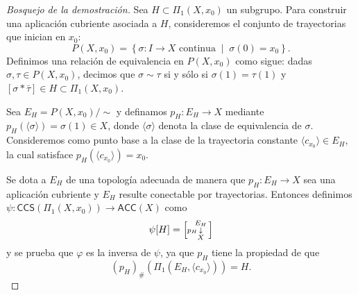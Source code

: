 \begin{proof}[Bosquejo de la demostración]
Sea $H \subset \Pi_1(X, x_0)$ un subgrupo. Para construir una aplicación cubriente asociada a $H$, consideremos el conjunto de trayectorias que inician en $x_0$:
\[
P(X, x_0) = \left\{ \sigma \colon I \to X \text{ continua} \;\middle|\; \sigma(0) = x_0 \right\}.
\]
Definimos una relación de equivalencia en $P(X, x_0)$ como sigue: dadas $\sigma, \tau \in P(X, x_0)$, decimos que $\sigma \sim \tau$ si y sólo si $\sigma(1) = \tau(1)$ y $[\sigma * \bar{\tau}] \in H \subset \Pi_1(X, x_0)$.

\begin{center}
\end{center}

Sea $E_H = P(X, x_0) / {\sim}$ y definamos $p_H \colon E_H \to X$ mediante $p_H(\langle \sigma \rangle) = \sigma(1) \in X$, donde $\langle \sigma \rangle$ denota la clase de equivalencia de $\sigma$. Consideremos como punto base a la clase de la trayectoria constante $\langle c_{x_0} \rangle \in E_H$, la cual satisface $p_H(\langle c_{x_0} \rangle) = x_0$.

Se dota a $E_H$ de una topología adecuada de manera que $p_H \colon E_H \to X$ sea una aplicación cubriente y $E_H$ resulte conectable por trayectorias. Entonces definimos $\psi \colon \textsf{CCS}(\Pi_1(X, x_0)) \to \textsf{ACC}(X)$ como 
$$\psi[H] = \left[\hspace{2mm}\begin{smallmatrix} E_H \\ \mathllap{\scriptstyle p_H\,}\downarrow \\ X \end{smallmatrix}\right]$$ 
y se prueba que $\varphi$ es la inversa de $\psi$, ya que $p_H$ tiene la propiedad de que 
$$(p_H)_{\#}\left(\Pi_1(E_H, \langle c_{x_0} \rangle)\right) = H.$$
\end{proof}

